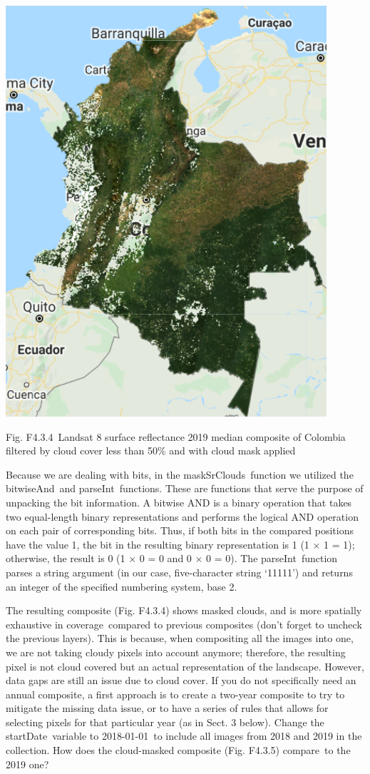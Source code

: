 \documentclass[
  letterpaper,
  DIV=11,
  numbers=noendperiod]{scrreprt}
\begin{document}
\includegraphics{./F4/image39.png}

Fig. F4.3.4~Landsat 8 surface reflectance 2019 median composite of
Colombia filtered by cloud cover less than 50\% and with cloud mask
applied

Because we are dealing with bits, in the maskSrClouds~function we
utilized the bitwiseAnd~and parseInt~functions. These are functions that
serve the purpose of unpacking the bit information. A bitwise AND is a
binary operation that takes two equal-length binary representations and
performs the logical AND operation on each pair of corresponding bits.
Thus, if both bits in the compared positions have the value 1, the bit
in the resulting binary representation is 1 (1 × 1 = 1); otherwise, the
result is 0 (1 × 0 = 0 and 0 × 0 = 0). The parseInt~function parses a
string argument (in our case, five-character string `11111') and returns
an integer of the specified numbering system, base 2.

The resulting composite (Fig. F4.3.4) shows masked clouds, and is more
spatially exhaustive in coverage~compared to previous composites (don't
forget to uncheck the previous layers). This is because, when
compositing all the images into one, we are not taking cloudy pixels
into account anymore; therefore, the resulting pixel is not cloud
covered but an actual representation of the landscape. However, data
gaps are still an issue due to cloud cover. If you do not specifically
need an annual composite, a first approach is to create a two-year
composite to try to mitigate the missing data issue, or to have a series
of rules that allows for selecting pixels for that particular year (as
in Sect. 3 below). Change the startDate~variable to 2018-01-01~to
include all images from 2018 and 2019 in the collection. How does the
cloud-masked composite (Fig. F4.3.5) compare~to the 2019 one?
\end{document}
